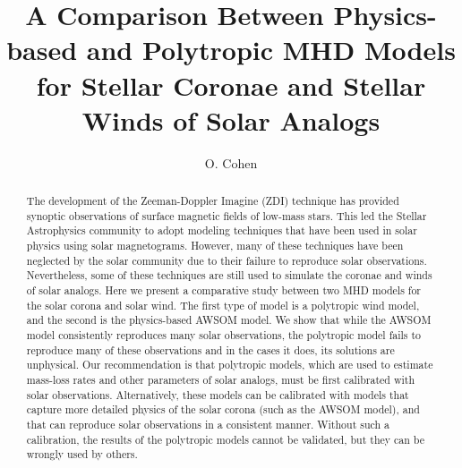 \documentclass[apj]{emulateapj}
\begin{document}

\title{A Comparison Between Physics-based and Polytropic MHD Models for Stellar Coronae and Stellar Winds of Solar Analogs}


\author{O. Cohen}


\begin{abstract}

The development of the Zeeman-Doppler Imagine (ZDI) technique has provided synoptic observations of surface magnetic fields of low-mass stars. This led the Stellar Astrophysics community to adopt modeling techniques that have been used in solar physics using solar magnetograms. However, many of these techniques have been neglected by the solar community due to their failure to reproduce solar observations. Nevertheless, some of these techniques are still used to simulate the coronae and winds of solar analogs. Here we present a comparative study between two MHD models for the solar corona and solar wind. The first type of model is a polytropic wind  model, and the second is the physics-based AWSOM model. We show that while the AWSOM model consistently reproduces many solar observations, the polytropic model fails to reproduce many of these observations and in the cases it does, its solutions are  unphysical. Our recommendation is that polytropic models, which are used to estimate mass-loss rates and other parameters of solar analogs, must be first calibrated with solar observations. Alternatively, these models can be calibrated with models that capture more detailed physics of the solar corona (such as the AWSOM model), and that can reproduce solar observations in a consistent manner. Without such a calibration, the results of the polytropic models cannot be validated, but they can be wrongly used by others. 

\end{abstract}
\end{document}
